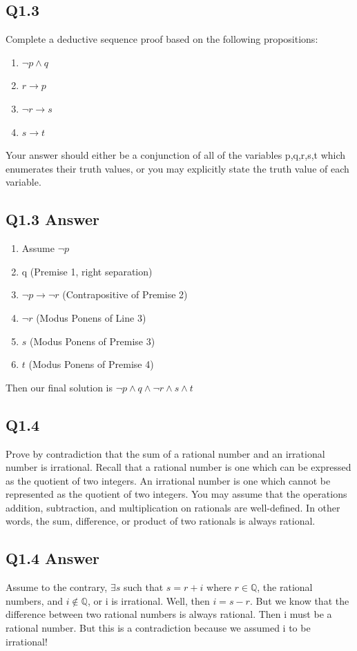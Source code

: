 \documentclass{article}
\begin{document}
\subsection*{Q1.3}
Complete a deductive sequence proof based on the following propositions:
\begin{enumerate}
    \item $\lnot p \land q$
    \item $r \rightarrow p$
    \item $\lnot r \rightarrow s$
    \item $s \rightarrow t$
\end{enumerate}
Your answer should either be a conjunction of all of the variables p,q,r,s,t which enumerates their
truth values, or you may explicitly state the truth value of each variable.
\newpage
\subsection*{Q1.3 Answer}
\begin{enumerate}
    \item Assume $\lnot p$
    \item q (Premise 1, right separation)
    \item $\lnot p \rightarrow \lnot r$ (Contrapositive of Premise 2)
    \item $\lnot r$ (Modus Ponens of Line 3)
    \item $s$ (Modus Ponens of Premise 3)
    \item $t$ (Modus Ponens of Premise 4)
\end{enumerate}
Then our final solution is $\lnot p \land q \land \lnot r \land s \land t$
\newpage

\subsection*{Q1.4}
Prove by contradiction that the sum of a rational number and an irrational number is irrational. Recall that a rational number is one
which can be expressed as the quotient of two integers. An irrational number is one which cannot be represented as the quotient of two integers.
You may assume that the operations addition, subtraction, and multiplication on rationals are well-defined. In other words, the sum, difference, or
product of two rationals is always rational.
\newpage
\subsection*{Q1.4 Answer}
Assume to the contrary, $\exists s$ such that $s = r + i$ where $r \in \mathbb{Q}$, the rational numbers, and $i \notin \mathbb{Q}$, or i is irrational.
Well, then $i = s - r$. But we know that the difference between two rational numbers is always rational. Then i must be a rational number. But this is a contradiction
because we assumed i to be irrational! 
\newpage
\end{document}
